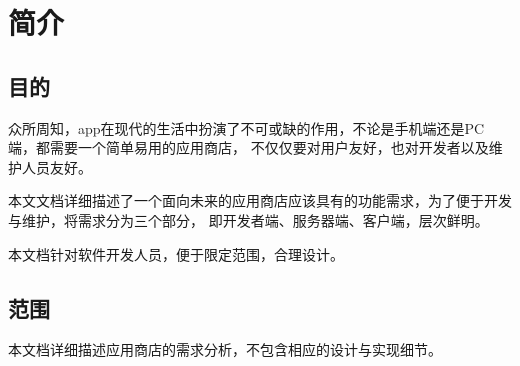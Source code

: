 \chapter{简介}
\section{目的}
众所周知，app在现代的生活中扮演了不可或缺的作用，不论是手机端还是PC端，都需要一个简单易用的应用商店，
不仅仅要对用户友好，也对开发者以及维护人员友好。

本文文档详细描述了一个面向未来的应用商店应该具有的功能需求，为了便于开发与维护，将需求分为三个部分，
即开发者端、服务器端、客户端，层次鲜明。

本文档针对软件开发人员，便于限定范围，合理设计。

\section{范围}
本文档详细描述应用商店的需求分析，不包含相应的设计与实现细节。
